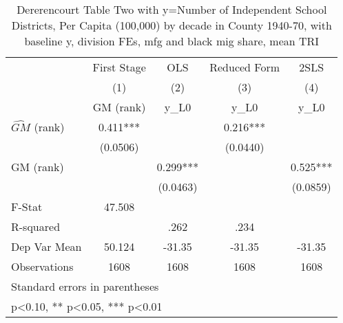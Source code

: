 \begin{table}[htbp]\centering
\def\sym#1{\ifmmode^{#1}\else\(^{#1}\)\fi}
\caption{Dererencourt Table Two with y=Number of Independent School Districts, Per Capita (100,000) by decade in County 1940-70, with baseline y, division FEs, mfg and black mig share, mean TRI}
\begin{tabular}{l*{4}{c}}
\toprule
                    & First Stage   &         OLS   &Reduced Form   &        2SLS   \\
                    &\multicolumn{1}{c}{(1)}&\multicolumn{1}{c}{(2)}&\multicolumn{1}{c}{(3)}&\multicolumn{1}{c}{(4)}\\
                    &\multicolumn{1}{c}{GM  (rank)}&\multicolumn{1}{c}{y\_L0}&\multicolumn{1}{c}{y\_L0}&\multicolumn{1}{c}{y\_L0}\\
\midrule
$\hat{GM}$ (rank)   &       0.411***&               &       0.216***&               \\
                    &    (0.0506)   &               &    (0.0440)   &               \\
\addlinespace
GM  (rank)          &               &       0.299***&               &       0.525***\\
                    &               &    (0.0463)   &               &    (0.0859)   \\
\midrule
F-Stat              &      47.508   &               &               &               \\
R-squared           &               &        .262   &        .234   &               \\
Dep Var Mean        &      50.124   &      -31.35   &      -31.35   &      -31.35   \\
Observations        &        1608   &        1608   &        1608   &        1608   \\
\bottomrule
\multicolumn{5}{l}{\footnotesize Standard errors in parentheses}\\
\multicolumn{5}{l}{\footnotesize * p<0.10, ** p<0.05, *** p<0.01}\\
\end{tabular}
\end{table}

